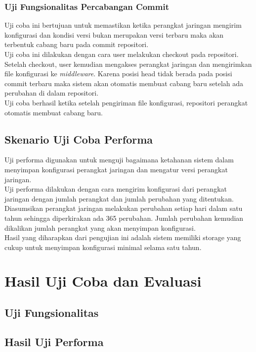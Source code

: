     	\subsubsection{Uji Fungsionalitas Percabangan Commit}
    	Uji coba ini bertujuan untuk memastikan ketika perangkat jaringan mengirim konfigurasi dan kondisi versi bukan merupakan versi terbaru maka akan terbentuk cabang baru pada commit repositori.\\
    	\indent Uji coba ini dilakukan dengan cara user melakukan checkout pada repositori. Setelah checkout, user kemudian mengakses perangkat jaringan dan mengirimkan file konfigurasi ke \textit{middleware}. Karena posisi head tidak berada pada posisi commit terbaru maka sistem akan otomatis membuat cabang baru setelah ada perubahan di dalam repositori.\\
    	Uji coba berhasil ketika setelah pengiriman file konfigurasi, repositori perangkat otomatis membuat cabang baru.
    	 
    \subsection{Skenario Uji Coba Performa}
    	Uji performa digunakan untuk menguji bagaimana ketahanan sistem dalam menyimpan konfigurasi perangkat jaringan dan mengatur versi perangkat jaringan.\\
    	\indent Uji performa dilakukan dengan cara mengirim konfigurasi dari perangkat jaringan dengan jumlah perangkat dan jumlah perubahan yang ditentukan. Diasumsikan perangkat jaringan melakukan perubahan setiap hari dalam satu tahun sehingga diperkirakan ada 365 perubahan. Jumlah perubahan kemudian dikalikan jumlah perangkat yang akan menyimpan konfigurasi. \\
    	\indent Hasil yang diharapkan dari pengujian ini adalah sistem memiliki storage yang cukup untuk menyimpan konfigurasi minimal selama satu tahun. 
    
\section{Hasil Uji Coba dan Evaluasi}
	
	\subsection{Uji Fungsionalitas}
    
   	
    \subsection{Hasil Uji Performa}
    	